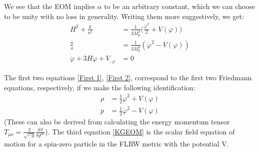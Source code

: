 \documentclass[aps,prd,reprint,preprintnumbers,showpacs,floatfix,nofootinbib,superscript address]{revtex4-2}
\begin{document}
We see that the EOM implies $\alpha$ to be an arbitrary constant, which we can choose to be unity with no loss in generality. Writing them more suggestively, we get:
\begin{align}
    H^2 + \frac{k}{a^2} &= \frac{1}{3M_p^2} \bigg( \frac{\dot{\varphi}^2}{2} + V(\varphi) \bigg) \label{First 1} \\
    \frac{ \ddot{a}}{a}  &=  \frac{1}{3M_p^2}\left(\dot{\varphi}^2 - V(\varphi) \right) \label{First 2} \\
    \ddot{\varphi} + 3H\dot{\varphi} + V_{,\varphi} &= 0    \label{KGEOM}
\end{align}

The first two equations \ref{First 1}, \ref{First 2}, correspond to the first two Friedmann equations, respectively, if we make the following identification:
\begin{align}   \label{presure and density}
    \rho &= \frac{1}{2} \dot{\varphi}^2 + V(\varphi) \nonumber \\
    p &= \frac{1}{2} \dot{\varphi}^2 - V(\varphi)
\end{align}
(These can also be derived from calculating the energy momentum tensor $T_{\mu\nu} = \frac{2}{\sqrt{-g}} \frac{\delta S}{\delta  g^{\mu \nu}}$).
The third equation \ref{KGEOM} is the scalar field equation of motion for a spin-zero particle in the FLRW metric with the potential V. 

\end{document}
